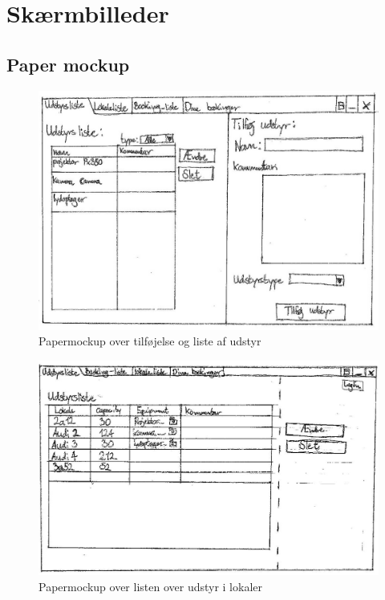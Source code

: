\chapter{Skærmbilleder}
\label{App_GUI}

\section{Paper mockup}
\label{App_GUI_paper}

\begin{figure}[h!]
  \centering
    \includegraphics[width=\textwidth]{Appendix/GUI-Prototype/PaperMockup/UdstyrsListe}
  \caption{Papermockup over tilføjelse og liste af udstyr}
\label{App_GUI_paper_UdstyrsListe}
\end{figure}

\begin{figure}[h!]
  \centering
    \includegraphics[width=\textwidth]{Appendix/GUI-Prototype/PaperMockup/LokaleUdstyrListe_001}
  \caption{Papermockup over listen over udstyr i lokaler}
\label{App_GUI_paper_LokaleUdstyrListe}
\end{figure}

